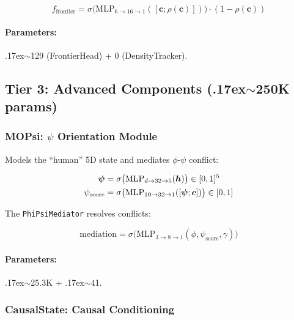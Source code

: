 \begin{equation}
    f_{\text{frontier}} = \sigma\big(\text{MLP}_{6 \to 16 \to 1}([\bm{c}; \rho(\bm{c})])\big) \cdot (1 - \rho(\bm{c}))
\end{equation}

\paragraph{Parameters:} {\raise.17ex\hbox{$\scriptstyle\sim$}}129 (FrontierHead) + 0 (DensityTracker).

\subsection{Tier 3: Advanced Components ({\raise.17ex\hbox{$\scriptstyle\sim$}}250K params)}

\subsubsection{MOPsi: $\psi$ Orientation Module}
\label{sec:mopsi}

Models the ``human'' 5D state and mediates $\phi$-$\psi$ conflict:

\begin{align}
    \bm{\psi} &= \sigma\big(\text{MLP}_{d \to 32 \to 5}(\bm{h})\big) \in [0, 1]^5 \\
    \psi_{\text{score}} &= \sigma\big(\text{MLP}_{10 \to 32 \to 1}([\bm{\psi}; \bm{c}])\big) \in [0, 1]
\end{align}

The \texttt{PhiPsiMediator} resolves conflicts:

\begin{equation}
    \text{mediation} = \sigma\big(\text{MLP}_{3 \to 8 \to 1}(\phi, \psi_{\text{score}}, \gamma)\big)
\end{equation}

\paragraph{Parameters:} {\raise.17ex\hbox{$\scriptstyle\sim$}}25.3K + {\raise.17ex\hbox{$\scriptstyle\sim$}}41.

\subsubsection{CausalState: Causal Conditioning}
\label{sec:causal}

